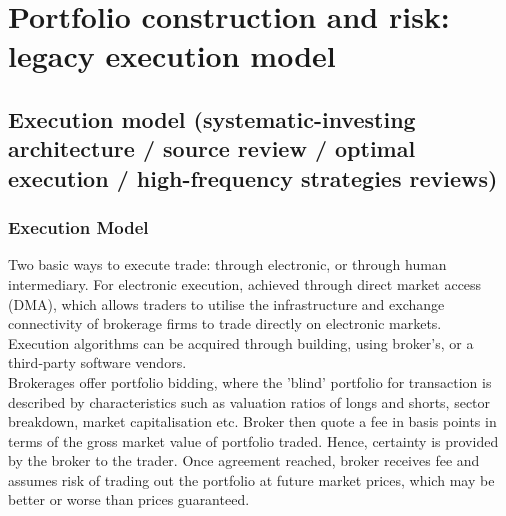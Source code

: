 \documentclass[a4paper,oneside,openany]{book}
\begin{document}
\chapter*{Portfolio construction and risk: legacy execution model}

\section*{Execution model (systematic-investing architecture / source review / optimal execution / high-frequency strategies reviews)}

\subsection*{Execution Model}

Two basic ways to execute trade: through electronic, or through human intermediary. For electronic execution, achieved through direct market access (DMA), which allows traders to utilise the infrastructure and exchange connectivity of brokerage firms to trade directly on electronic markets.\\
Execution algorithms can be acquired through building, using broker's, or a third-party software vendors.\\
Brokerages offer portfolio bidding, where the 'blind' portfolio for transaction is described by characteristics such as valuation ratios of longs and shorts, sector breakdown, market capitalisation etc. Broker then quote a fee in basis points in terms of the gross market value of portfolio traded. Hence, certainty is provided by the broker to the trader. Once agreement reached, broker receives fee and assumes risk of trading out the portfolio at future market prices, which may be better or worse than prices guaranteed.
\end{document}
